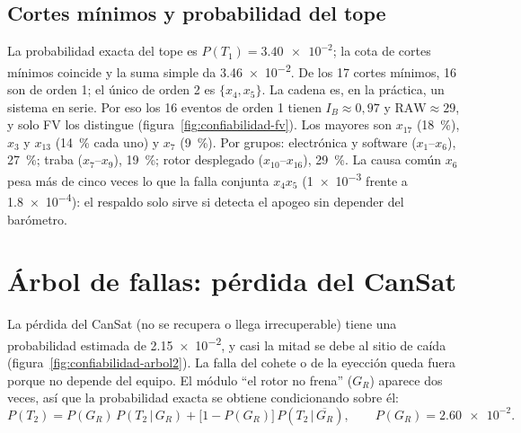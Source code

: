 \subsection{Cortes mínimos y probabilidad del tope}
La probabilidad exacta del tope es $P(T_1)=\num{3.40e-2}$; la cota de cortes mínimos
coincide y la suma simple da \num{3.46e-2}. De los 17 cortes mínimos, 16 son de orden 1;
el único de orden 2 es $\{x_4,x_5\}$. La cadena es, en la práctica, un sistema en serie.
Por eso los 16 eventos de orden 1 tienen $I_B\approx0{,}97$ y $\mathrm{RAW}\approx29$, y
solo FV los distingue (figura~\ref{fig:confiabilidad-fv}). Los mayores son $x_{17}$
(\SI{18}{\percent}), $x_3$ y $x_{13}$ (\SI{14}{\percent} cada uno) y $x_7$
(\SI{9}{\percent}). Por grupos: electrónica y software ($x_1$--$x_6$), \SI{27}{\percent};
traba ($x_7$--$x_9$), \SI{19}{\percent}; rotor desplegado ($x_{10}$--$x_{16}$),
\SI{29}{\percent}. La causa común $x_6$ pesa más de cinco veces lo que la falla conjunta
$x_4x_5$ (\num{1e-3} frente a \num{1.8e-4}): el respaldo solo sirve si detecta el apogeo
sin depender del barómetro.

\section{Árbol de fallas: pérdida del CanSat}\label{sec:confiabilidad-arbol2}
La pérdida del CanSat (no se recupera o llega irrecuperable) tiene una probabilidad
estimada de \num{2.15e-2}, y casi la mitad se debe al sitio de caída
(figura~\ref{fig:confiabilidad-arbol2}). La falla del cohete o de la eyección queda fuera
porque no depende del equipo. El módulo ``el rotor no frena'' ($G_R$) aparece dos veces,
así que la probabilidad exacta se obtiene condicionando sobre él:
\begin{equation}
  P(T_2)=P(G_R)\,P(T_2\,|\,G_R)+\bigl[1-P(G_R)\bigr]\,P(T_2\,|\,\overline{G_R}),
  \qquad P(G_R)=\num{2.60e-2}.
  \label{eq:confiabilidad-shannon}
\end{equation}

